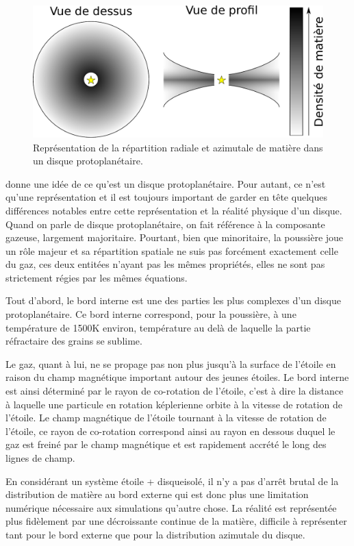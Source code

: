 \begin{figure}[htb]
\centering
\includegraphics[width=0.45\linewidth]{figure/disk_scheme.pdf}
\caption{Représentation de la répartition radiale et azimutale de matière dans un disque protoplanétaire.}\label{fig:disk_scheme}
\end{figure}

 donne une idée de ce qu'est un disque protoplanétaire. Pour autant, ce n'est qu'une représentation et il est toujours important de garder en tête quelques différences notables entre cette représentation et la réalité physique d'un disque. Quand on parle de disque protoplanétaire, on fait référence à la composante gazeuse, largement majoritaire. Pourtant, bien que minoritaire, la poussière joue un rôle majeur et sa répartition spatiale ne suis pas forcément exactement celle du gaz, ces deux entitées n'ayant pas les mêmes propriétés, elles ne sont pas strictement régies par les mêmes équations.

\bigskip

Tout d'abord, le bord interne est une des parties les plus complexes d'un disque protoplanétaire. Ce bord interne correspond, pour la poussière, à une température de 1500K environ, température au delà de laquelle la partie réfractaire des grains se sublime. 

Le gaz, quant à lui, ne se propage pas non plus jusqu'à la surface de l'étoile en raison du champ magnétique important autour des jeunes étoiles. Le bord interne est ainsi déterminé par le rayon de co-rotation de l'étoile, c'est à dire la distance à laquelle une particule en rotation képlerienne orbite à la vitesse de rotation de l'étoile. Le champ magnétique de l'étoile tournant à la vitesse de rotation de l'étoile, ce rayon de co-rotation correspond ainsi au rayon en dessous duquel le gaz est freiné par le champ magnétique et est rapidement accrété le long des lignes de champ. 

\bigskip

En considérant un système \og étoile + disque\fg isolé, il n'y a pas d'arrêt brutal de la distribution de matière au bord externe qui est donc plus une limitation numérique nécessaire aux simulations qu'autre chose. La réalité est représentée plus fidèlement par une décroissante continue de la matière, difficile à représenter tant pour le bord externe que pour la distribution azimutale du disque. 

